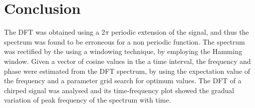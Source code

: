 \documentclass[11pt, a4paper]{article}
\begin{document}
\section*{Conclusion}
The DFT was obtained using a 2$\pi$ periodic extension of the signal, and thus the spectrum was found to be erroneous for a non periodic function. The spectrum was rectified by the using a windowing technique, by employing the Hamming window. Given a vector of cosine values in the a time interval, the frequency and phase were estimated from the DFT spectrum, by using the expectation value of the frequency and a parameter grid search for optimum values. The DFT of a chirped signal was analysed and its time-frequency plot showed the gradual variation of peak frequency of the spectrum with time.
\end{document}
